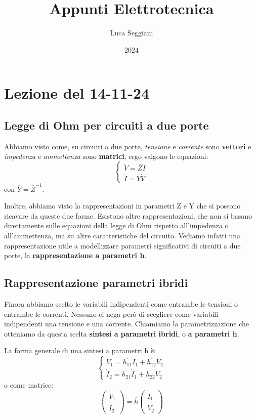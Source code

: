 \documentclass[a4paper,11pt]{article}
\title{Appunti Elettrotecnica}
\author{Luca Seggiani}
\date{2024}
\begin{document}
\section{Lezione del 14-11-24}

\thispagestyle{empty}
\pagestyle{fancy}

\subsection{Legge di Ohm per circuiti a due porte}
Abbiamo visto come, su circuiti a due porte, \textit{tensione} e \textit{corrente} sono \textbf{vettori} e \textit{impedenza} e \textit{ammettenza} sono \textbf{matrici}, ergo valgono le equazioni:
\[
	\begin{cases}
		\dot{V} = \overline{Z} \dot{I} \\ 
		\dot{I} = \overline{Y} \dot{V}
	\end{cases}
\]
con $\overline{Y} = \overline{Z}^{-1}$. 

Inoltre, abbiamo visto la rappresentazioni in parametri Z e Y che si possono ricavare da queste due forme.
Esistono altre rappresentazioni, che non si basano direttamente sulle equazioni della legge di Ohm rispetto all'impedenza o all'ammettenza, ma su altre caratteristiche del circuito.
Vediamo infatti una rappresentazione utile a modellizzare parametri significativi di circuiti a due porte, la \textbf{rappresentazione a parametri h}.

\subsection{Rappresentazione parametri ibridi}
Finora abbiamo scelto le variabili indipendenti come entrambe le tensioni o entrambe le correnti. 
Nessuno ci nega però di scegliere come variabili indipendenti una tensione e una corrente.
Chiamiamo la parametrizzazione che otteniamo da questa scelta \textbf{sintesi a parametri ibridi}, o \textbf{a parametri h}.

La forma generale di una sintesi a parametri h è:
\[
	\begin{cases}
		\dot{V}_1 = \overline{h_{11}} \dot{I}_1 + \overline{h_{12}} \dot{V}_2 \\ 
		\dot{I}_2 = \overline{h_{21}} \dot{I}_1 + \overline{h_{22}} \dot{V}_2
	\end{cases}
\]
o come matrice:
$$
\begin{pmatrix}
	\dot{V}_1 \\ \dot{I}_2
\end{pmatrix}
= \overline{h}
\begin{pmatrix}
	\dot{I}_1 \\ \dot{V}_2
\end{pmatrix}
$$
\end{document}
